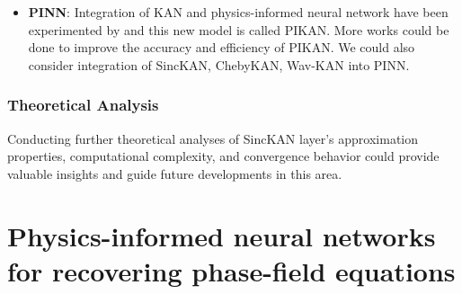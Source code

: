 \begin{itemize}
The objective will be to train \(\theta\) so that the distribution of the model \(x\) is approximately equal to the distribution of the data \(x_{\text{true}}\). (For some notion of ‘approximate’.) Unsurprisingly, integration of KAN and neural SDE is still an unexplored zone: works remain to be done on designing more efficient neural SDE architecture, finding expressive choices of vector field, and determining how to train these models effectively. Another promising direction is to apply them to myriad scientific machine learning tasks.

    \item \textbf{PINN}: Integration of KAN and physics-informed neural network have been experimented by \cite{wang2024kolmogorov} and this new model is called PIKAN. More works could be done to improve the accuracy and efficiency of PIKAN. We could also consider integration of SincKAN, ChebyKAN, Wav-KAN into PINN.
\end{itemize}


\subsubsection*{Theoretical Analysis}
Conducting further theoretical analyses of SincKAN layer’s approximation properties, computational complexity, and convergence behavior could provide valuable insights and guide future developments in this area.


\section{Physics-informed neural networks for recovering phase-field equations}

